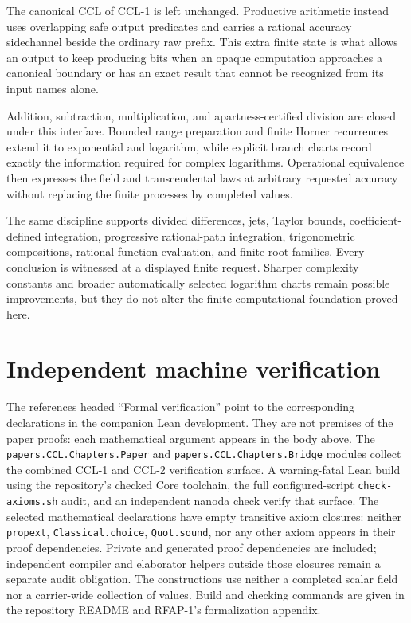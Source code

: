 \documentclass[10pt]{article}
\theoremstyle{definition}
\theoremstyle{remark}
\begin{document}
The canonical CCL of CCL-1 is left unchanged.  Productive arithmetic instead
uses overlapping safe output predicates and carries a rational accuracy
sidechannel beside the ordinary raw prefix.  This extra finite state is what
allows an output to keep producing bits when an opaque computation approaches
a canonical boundary or has an exact result that cannot be recognized from
its input names alone.

Addition, subtraction, multiplication, and apartness-certified division are
closed under this interface.  Bounded range preparation and finite Horner
recurrences extend it to exponential and logarithm, while explicit branch
charts record exactly the information required for complex logarithms.
Operational equivalence then expresses the field and transcendental laws at
arbitrary requested accuracy without replacing the finite processes by
completed values.

The same discipline supports divided differences, jets, Taylor bounds,
coefficient-defined integration, progressive rational-path integration,
trigonometric compositions, rational-function evaluation, and finite root
families.  Every conclusion is witnessed at a displayed finite request.
Sharper complexity constants and broader automatically selected logarithm
charts remain possible improvements, but they do not alter the finite
computational foundation proved here.
\fi

\appendix
\section{Independent machine verification}

The references headed ``Formal verification'' point to the corresponding
declarations in the companion Lean development.  They are not premises of the
paper proofs: each mathematical argument appears in the body above.  The
\texttt{papers.CCL.Chapters.Paper} and
\texttt{papers.CCL.Chapters.Bridge} modules collect the combined CCL-1 and
CCL-2 verification surface.  A warning-fatal Lean build using the repository's
checked Core toolchain, the full configured-script
\texttt{check-axioms.sh} audit, and an independent nanoda check verify that
surface.  The selected mathematical declarations have empty transitive axiom
closures: neither \texttt{propext}, \texttt{Classical.choice},
\texttt{Quot.sound}, nor any other axiom appears in their proof dependencies.
Private and generated proof dependencies are included; independent compiler
and elaborator helpers outside those closures remain a separate audit
obligation.  The constructions use neither a completed scalar field nor a
carrier-wide collection of values.  Build and checking commands are given in
the repository README and RFAP-1's formalization appendix.
\end{document}
